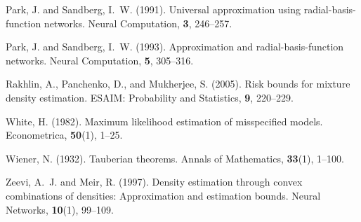 \documentclass[11pt]{article}
\theoremstyle{definition}
\begin{document}
\begin{thebibliography}{}
Park, J. and Sandberg, I.~W. (1991).
Universal approximation using radial-basis-function networks.
Neural Computation, \textbf{3}, 246--257.

Park, J. and Sandberg, I.~W. (1993).
Approximation and radial-basis-function networks.
Neural Computation, \textbf{5}, 305--316.

Rakhlin, A., Panchenko, D., and Mukherjee, S. (2005).
Risk bounds for mixture density estimation.
ESAIM: Probability and Statistics, \textbf{9}, 220--229.

White, H. (1982).
Maximum likelihood estimation of misspecified models.
Econometrica, \textbf{50}(1), 1--25.

Wiener, N. (1932).
Tauberian theorems.
Annals of Mathematics, \textbf{33}(1), 1--100.

Zeevi, A.~J. and Meir, R. (1997).
Density estimation through convex combinations of densities: Approximation and estimation bounds.
Neural Networks, \textbf{10}(1), 99--109.

\end{thebibliography}
\end{document}
